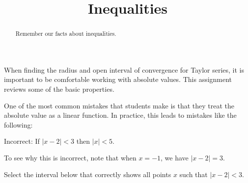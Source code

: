 \documentclass{ximera}
\title[Refresh:]{Inequalities}
\begin{document}
\begin{abstract}
  Remember our facts about inequalities.
\end{abstract}
\maketitle

\begin{problem}
  When finding the radius and open interval of convergence for Taylor series, it is important to be comfortable working with absolute values.
  This assignment reviews some of the basic properties.
  
  \begin{multipleChoice}
  \end{multipleChoice}
\end{problem}

\begin{problem}
 One of the most common mistakes that students make is that they treat the absolute value as a linear function.
 In practice, this leads to mistakes like the following:
 
 Incorrect: If $|x - 2| < 3$ then $|x| < 5$.
 
 To see why this is incorrect, note that when $x = -1$, we have $|x - 2| = 3$.
 
  Select the interval below that correctly shows all points $x$ such that $|x - 2| < 3$.
  \begin{multipleChoice}
  \end{multipleChoice}
\end{problem}
\end{document}
